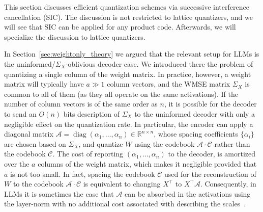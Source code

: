 \documentclass[journal]{IEEEtran}
\newcommand{\RR}{\mathbb{R}}
\newcommand{\diag}{\mathop{\mathrm{diag}}}
\newcommand{\m}{\mathcal}
\begin{document}
This section discusses efficient quantization schemes via successive interference cancellation (SIC). The discussion is not restricted to lattice quantizers, and we will see that SIC can be applied for any product code. Afterwards, we will specialize the discussion to lattice quantizers.

In Section~\ref{sec:weightonly_theory} we argued that the relevant setup for LLMs is the uninformed/$\Sigma_X$-oblivious decoder case. We introduced there the problem of quantizing a single column of the weight matrix. In practice, however, a weight matrix will typically have $a\gg 1$ column vectors, and the WMSE matrix $\Sigma_X$ is common to all of them (as they all operate on the same activations). If the number of column vectors is of the same order as $n$, it is possible for the decoder to send an $O(n)$ bits description of $\Sigma_X$ to the uninformed decoder with only a negligible effect on the quantization rate. In particular, the encoder can apply a diagonal  matrix $\m{A}=\diag(\alpha_1,\ldots,\alpha_n)\in\RR^{n\times n}$, whose spacing coefficients $\{\alpha_i\}$ are chosen based on $\Sigma_X$, and quantize $W$ using the codebook $\m{A}\cdot\m{C}$ rather than the codebook $\m{C}$. The cost of reporting $(\alpha_1,\ldots,\alpha_n)$ to the decoder, is amortized over the $a$ columns of the weight matrix, which makes it negligible provided that $a$ is not too small. In fact, spacing the codebook $\m{C}$ used for the reconstruction of $W$ to the codebook $\m{A}\cdot\m{C}$ is equivalent to changing $X^\top$ to $X^\top \m{A}$. Consequently, in LLMs it is sometimes the case that $\m{A}$ can be absorbed in the activations using the layer-norm with no additional cost associated with describing the scales~\cite{xiao2023smoothquant}.
\end{document}

